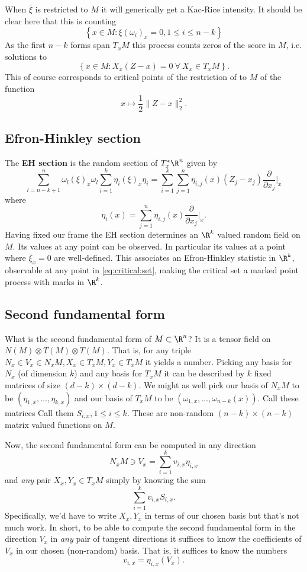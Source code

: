\documentclass{article}
\begin{document}
When $\bar{\xi}$ is restricted to $M$ it will generically get a Kac-Rice intensity. It should be
clear here that this is counting
$$
\left\{x \in M: \xi(\omega_i)_x=0, 1 \leq i \leq n-k\right\}
$$
As the first $n-k$ forms span $T_xM$  this process counts zeros of the score in $M$, i.e.
solutions to
\begin{equation}
\label{eq:critical:set}
\left\{x \in M: X_x(Z-x)=0 \ \forall \  X_x \in T_xM\right\}.
\end{equation}
This of course corresponds to critical points of the restriction of  to $M$ of the function
$$
x \mapsto \frac{1}{2}\|Z-x\|^2_2.
$$

\subsection{Efron-Hinkley section}

The {\bf EH section} is the random section of $T_x^*\R^n$ given by
$$
\sum_{l=n-k+1}^n \omega_l(\xi)_x \omega_l
\sum_{i=1}^k \eta_i(\xi)_x \eta_i = \sum_{i=1}^k \sum_{j=1}^n \eta_{i,j}(x)(Z_j - x_j) \frac{\partial}{\partial x_j} \biggl|_x
$$
where
$$
\eta_i(x) = \sum_{j=1}^n \eta_{i,j}(x) \frac{\partial}{\partial x_j} \biggl|_x.
$$
Having fixed our frame the EH section determines an $\R^k$ valued random field on $M$. Its values at any point can be observed. In particular its values at a point where $\bar{\xi}_x=0$
are well-defined. This associates an Efron-Hinkley statistic in $\R^k$, observable at any point in \eqref{eq:critical:set}, making the critical set a marked point process with marks in
$\R^k$.

\subsection{Second fundamental form}

What is the second fundamental form of $M \subset \R^n$? It is a
tensor field on $N(M) \otimes T(M) \otimes T(M)$. That is, for any
triple $N_x \in V_x \in N_xM, X_x \in T_xM, Y_x \in T_xM$ it yields a
number. Picking any basis for $N_x$ (of dimension $k$) and any
basis for $T_xM$ it can be
described by $k$ fixed matrices of size $(d-k) \times (d-k)$. We might
as well pick our basis of $N_xM$ to be $(\eta_{1,x}, \dots, \eta_{k,x})$
and our basis of $T_xM$ to be $(\omega_{1,x}, \dots, \omega_{n-k}(x))$.
Call these matrices
Call them $S_{i,x}, 1 \leq i \leq k$. These are non-random $(n-k) \times (n-k)$ matrix valued functions on
$M$.

Now, the second fundamental form can be computed in any direction
$$
N_xM \ni V_x = \sum_{i=1}^k v_{i,x} \eta_{i,x}
$$ and {\em any} pair $X_x,Y_x \in T_xM$ simply by knowing the sum
$$
\sum_{i=1}^k v_{i,x} S_{i,x}.
$$
Specifically, we'd have to write $X_x, Y_x$ in terms of our chosen basis but that's not much work. In short, to be able to compute the second fundamental form in the direction $V_x$ in {\em any} pair of tangent
directions it suffices to know the coefficients of $V_x$ in our chosen (non-random) basis. That is, it suffices to know the numbers
$$
v_{i,x} = \eta_{i,x}(V_x).
$$
\end{document}
